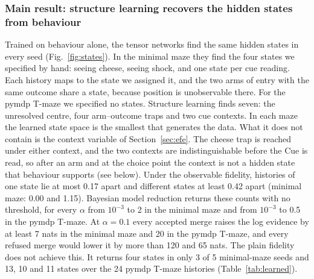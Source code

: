 \documentclass[pdflatex,sn-apa]{sn-jnl}%
\theoremstyle{definition}
\begin{document}
\subsubsection{Main result: structure learning recovers the hidden states from behaviour} Trained on behaviour alone, the tensor networks find the same hidden states in every seed (Fig.~\ref{fig:states}). In the minimal maze they find the four states we specified by hand: seeing cheese, seeing shock, and one state per cue reading. Each history maps to the state we assigned it, and the two arms of entry with the same outcome share a state, because position is unobservable there. For the pymdp T-maze we specified no states. Structure learning finds seven: the unresolved centre, four arm--outcome traps and two cue contexts. In each maze the learned state space is the smallest that generates the data. What it does not contain is the context variable of Section~\ref{sec:efe}. The cheese trap is reached under either context, and the two contexts are indistinguishable before the Cue is read, so after an arm and at the choice point the context is not a hidden state that behaviour supports (see below). Under the observable fidelity, histories of one state lie at most 0.17 apart and different states at least 0.42 apart (minimal maze: 0.00 and 1.15). Bayesian model reduction returns these counts with no threshold, for every $\alpha$ from $10^{-3}$ to 2 in the minimal maze and from $10^{-3}$ to 0.5 in the pymdp T-maze. At $\alpha = 0.1$ every accepted merge raises the log evidence by at least 7 nats in the minimal maze and 20 in the pymdp T-maze, and every refused merge would lower it by more than 120 and 65 nats. The plain fidelity does not achieve this. It returns four states in only 3 of 5 minimal-maze seeds and 13, 10 and 11 states over the 24 pymdp T-maze histories (Table~\ref{tab:learned}).
\end{document}
